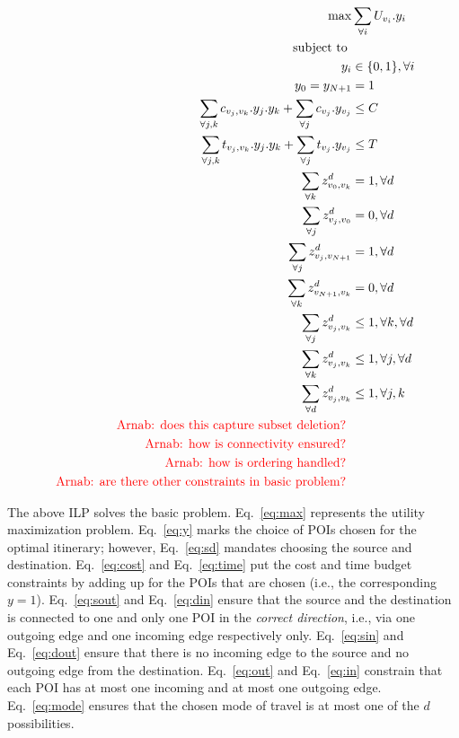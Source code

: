 \begin{align}
	\max & \sum_{\forall i} U_{v_{i}} . y_{i} \\
		\label{eq:max}
	\text{subject to } & \nonumber \\
	y_{i} & \in \{ 0, 1 \}, \forall i \\
		\label{eq:y}
	y_{0} = y_{{N+1}} & = 1 \\
		\label{eq:sd}
	\sum_{\forall j, k} c_{v_{j},v_{k}} . y_{j} . y_{k} + \sum_{\forall j} c_{v_j} . y_{v_j} & \leq C \\
		\label{eq:cost}
	\sum_{\forall j, k} t_{v_{j},v_{k}} . y_{j} . y_{k} + \sum_{\forall j} t_{v_j} . y_{v_j} & \leq T \\
		\label{eq:time}
	\sum_{\forall k} z^d_{v_{0},v_{k}} & = 1, \forall d \\
		\label{eq:sout}
	\sum_{\forall j} z^d_{v_{j},v_{0}} & = 0, \forall d \\
		\label{eq:sin}
	\sum_{\forall j} z^d_{v_{j},v_{N+1}} & = 1, \forall d \\
		\label{eq:din}
	\sum_{\forall k} z^d_{v_{N+1},v_{k}} & = 0, \forall d \\
		\label{eq:dout}
	\sum_{\forall j} z^d_{v_{j},v_{k}} & \leq 1, \forall k, \forall d \\
		\label{eq:out}
	\sum_{\forall k} z^d_{v_{j},v_{k}} & \leq 1, \forall j, \forall d \\
		\label{eq:in}
	\sum_{\forall d} z^d_{v_{j},v_{k}} & \leq 1, \forall j, k \\
		\label{eq:mode}
	\text{ \textcolor{red}{Arnab: does this capture subset deletion?} } & \\
	\text{ \textcolor{red}{Arnab: how is connectivity ensured?} } & \\
	\text{ \textcolor{red}{Arnab: how is ordering handled?} } & \\
	\text{ \textcolor{red}{Arnab: are there other constraints in basic problem?} } &
\end{align}

The above ILP solves the basic \trip problem.
Eq.~\eqref{eq:max} represents the utility maximization problem.
Eq.~\eqref{eq:y} marks the choice of POIs chosen for the optimal itinerary; however, Eq.~\eqref{eq:sd} mandates choosing the source and destination.
Eq.~\eqref{eq:cost} and Eq.~\eqref{eq:time} put the cost and time budget constraints by adding up for the POIs that are chosen (i.e., the corresponding $y = 1$).
Eq.~\eqref{eq:sout} and Eq.~\eqref{eq:din} ensure that the source and the destination is connected to one and only one POI in the \emph{correct direction}, i.e., via one outgoing edge and one incoming edge respectively only.
Eq.~\eqref{eq:sin} and Eq.~\eqref{eq:dout} ensure that there is no incoming edge to the source and no outgoing edge from the destination.
Eq.~\eqref{eq:out} and Eq.~\eqref{eq:in} constrain that each POI has at most one incoming and at most one outgoing edge.
Eq.~\eqref{eq:mode} ensures that the chosen mode of travel is at most one of the $d$ possibilities.

